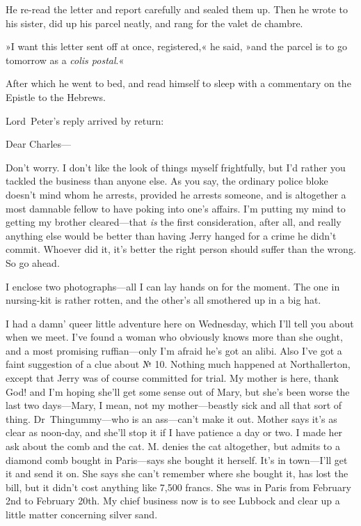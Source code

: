 He re-read the letter and report carefully and sealed them up. Then he wrote to his sister, did up his parcel neatly, and rang for the valet de chambre.

»I want this letter sent off at once, registered,« he said, »and the parcel is to go tomorrow as a \textit{colis postal}.«

After which he went to bed, and read himself to sleep with a commentary on the Epistle to the Hebrews.

\divider

Lord~Peter's reply arrived by return:

\begin{mail}{}{Dear Charles---}

Don't worry. I don't like the look of things myself frightfully, but I'd rather you tackled the business than anyone else. As you say, the ordinary police bloke doesn't mind whom he arrests, provided he arrests someone, and is altogether a most damnable fellow to have poking into one's affairs. I'm putting my mind to getting my brother cleared—that \textit{is} the first consideration, after all, and really anything else would be better than having Jerry hanged for a crime he didn't commit. Whoever did it, it's better the right person should suffer than the wrong. So go ahead.

I enclose two photographs—all I can lay hands on for the moment. The one in nursing-kit is rather rotten, and the other's all smothered up in a big hat.

I had a damn' queer little adventure here on Wednesday, which I'll tell you about when we meet. I've found a woman who obviously knows more than she ought, and a most promising ruffian—only I'm afraid he's got an alibi. Also I've got a faint suggestion of a clue about № 10. Nothing much happened at Northallerton, except that Jerry was of course committed for trial. My mother is here, thank God! and I'm hoping she'll get some sense out of Mary, but she's been worse the last two days—Mary, I mean, not my mother—beastly sick and all that sort of thing. Dr~Thingummy—who is an ass—can't make it out. Mother says it's as clear as noon-day, and she'll stop it if I have patience a day or two. I made her ask about the comb and the cat. M\@. denies the cat altogether, but admits to a diamond comb bought in Paris—says she bought it herself. It's in town—I'll get it and send it on. She says she can't remember where she bought it, has lost the bill, but it didn't cost anything like 7,500 francs. She was in Paris from February 2nd to February 20th. My chief business now is to see Lubbock and clear up a little matter concerning silver sand.


\end{mail}
